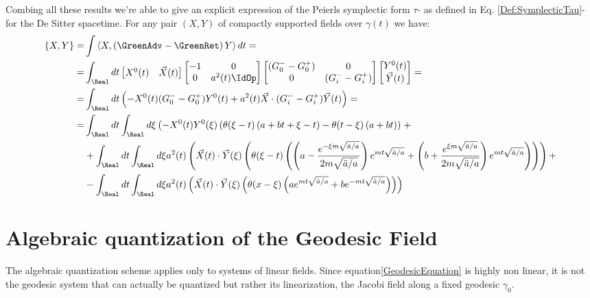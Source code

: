 \documentclass[Main]{subfiles}
\begin{document}
			Combing all these results we're able to give an explicit expression of the Peierls symplectic form $\tau$- as defined in Eq. 	\ref{Def:SymplecticTau}- for the De Sitter spacetime.
			For any pair $(X, Y)$ of compactly supported fields over $\gamma(t)$ we have:
			\begin{align*}
			\{X ,Y \} =&\int \left\langle X, \left(\GreenAdv - \GreenRet \right)Y \right\rangle dt =	\\
			=&
			\int_\Real dt  
				 \begin{bmatrix}  
					 X^0(t) & \vec{X}(t) \\
				 \end{bmatrix}
				 \begin{bmatrix}  
				 	-1 & 0 \\
				 	0 & a^2(t)\IdOp
				 \end{bmatrix}			
				 \begin{bmatrix}  
				 	(G^-_0 - G^+_0) & 0 \\
				 	0 & (G^-_i - G^+_i)
				 \end{bmatrix}	
				 \begin{bmatrix}  
				 	Y^0(t) \\ \vec{Y}(t)
				 \end{bmatrix}	
				 = \\
			=&
				\int_\Real dt  \left(
					-X^0(t) (G^-_0 - G^+_0)Y^0(t)+
					a^2(t)\vec{X} \cdot (G^-_i- G^+_i)\vec{Y}(t)
				\right) = \\
			=&
				\int_\Real dt 				\int_\Real d\xi \left(
					-X^0(t)Y^0(\xi)\left(
					\theta(\xi -t) \left( a +b t + \xi -t\right) -  \theta(t-\xi) \left(a +b t \right)
					\right) \right. +\\
			&+
					\int_\Real dt 				\int_\Real d\xi a^2(t) \left(
					\vec{X}(t) \cdot \vec{Y}(\xi)
					\left(
					 \theta(\xi -t) \left( 
				\left(a-\frac{e^{-\xi m \sqrt{\ddot{a}/a}}}{2 m \sqrt{\ddot{a}/a}} \right) e^{m t \sqrt{\ddot{a}/a}}+
				\left(b +\frac{e^{\xi m \sqrt{\ddot{a}/a}}}{2 m \sqrt{\ddot{a}/a}} \right) e^{m t \sqrt{\ddot{a}/a}}			
				\right)\right)
					\right)+ \\
			&-
					\int_\Real dt 				\int_\Real d\xi a^2(t) \left( 
					\vec{X}(t)\cdot \vec{Y}(\xi)
						 \left( 
							\theta( x - \xi) \left(a e^{m t \sqrt{\ddot{a}/a}} + b e^{-m t \sqrt{\ddot{a}/a}}\right)
						\right)
					\right)
			\end{align*}						

			
		

\section{Algebraic quantization of the Geodesic Field}
	The algebraic quantization scheme applies only to %
	systems of linear fields.
	Since equation\ref{GeodesicEquation} is highly non linear,  it is not the geodesic system that can actually be quantized but rather its linearization, the Jacobi field along a fixed geodesic $\gamma_0$.
	
\end{document}
